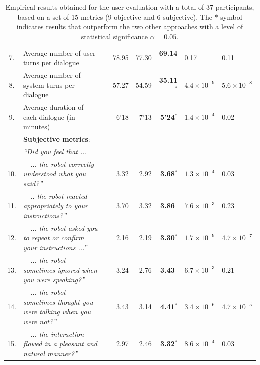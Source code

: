 \begin{table}
\begin{tabular}{|cp{110mm}c|r:r:r|p{16mm}|p{16mm}|}
7.& Average number of user turns per dialogue && 78.95 & 77.30 & \textbf{69.14}$^{\phantom{*}}$ & 0.17 & 0.11 \\ 
8.& Average number of system turns per dialogue && 57.27 & 54.59 & \textbf{35.11}$^{\mathbf{*}}$ & $4.4\!\times\!10^{-9}$ &  $5.6\!\times\!10^{-8}$\\ 
9.& Average duration of each dialogue  (in minutes) \vspace{3mm} && 6'18 & 7'13 &\textbf{ 5'24}$^{\mathbf{*}}$ & $1.4\!\times\!10^{-4}$ & 0.02 \\ \hdashline
& \vspace{-2mm} \textbf{Subjective metrics}:  && & & & & \\ 
&\textit{``Did you feel that ...}  && & & & & \\ 
10.&\ \ \textit{... the robot correctly understood what you said?''}  && 3.32 & 2.92 &  \textbf{3.68}$^{\mathbf{*}}$ & $1.3\!\times\!10^{-4}$ & 0.03 \\
11.& \ \ \textit{.. the robot reacted appropriately to your instructions?''}   && 3.70 & 3.32 & \textbf{3.86}$^{\phantom{*}}$ & $7.6\!\times\!10^{-3}$ & 0.23 \\
12.&\ \ \textit{... the robot asked you to repeat or confirm your instructions ...''}   & & 2.16 & 2.19 & \textbf{3.30}$^{\mathbf{*}}$ & $1.7\!\times\!10^{-9}$ & $4.7\!\times\!10^{-7}$ \\
13.&\ \ \textit{... the robot sometimes ignored when you were speaking?''}  & & 3.24 & 2.76 & \textbf{3.43}$^{\phantom{*}}$ & $6.7\!\times\!10^{-3}$ & 0.21 \\
14.&\ \ \textit{... the robot sometimes thought you were talking when you were not?''}  & & 3.43 & 3.14 & \textbf{4.41}$^{\mathbf{*}}$ & $3.4\!\times\!10^{-6}$ & $4.7\!\times\!10^{-5}$ \\
15.&\ \ \textit{... the interaction flowed in a pleasant and natural manner?''} \vspace{3mm}  & & 2.97 & 2.46 & \textbf{3.32}$^{\mathbf{*}}$ & $8.6\!\times\!10^{-4}$ & 0.03 \\ \hline
\end{tabular} \vspace{3mm}
\label{table:results_exp3}
\caption{Empirical results obtained for the user evaluation with a total of 37 participants, based on a set of 15 metrics (9 objective and 6 subjective). The $\mathbf{*}$ symbol indicates results that outperform the two other approaches with a level of statistical significance $\alpha = 0.05$. }
\end{table}

